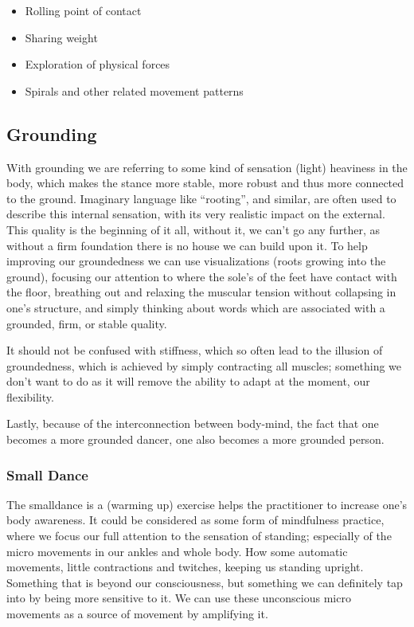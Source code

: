 \begin{itemize}
    \item Rolling point of contact
    \item Sharing weight
    \item Exploration of physical forces
    \item Spirals and other related movement patterns
\end{itemize}

\subsection{Grounding}\label{subsec:grounding}

With grounding we are referring to some kind of sensation (light) heaviness in the body, which makes the stance more stable, more robust and thus more connected to the ground.
Imaginary language like ``rooting'', and similar, are often used to describe this internal sensation, with its very realistic impact on the external.
This quality is the beginning of it all, without it, we can't go any further, as without a firm foundation there is no house we can build upon it.
To help improving our groundedness we can use visualizations (roots growing into the ground), focusing our attention to where the sole's of the feet have contact with the floor, breathing out and relaxing the muscular tension without collapsing in one's structure, and simply thinking about words which are associated with a grounded, firm, or stable quality.

It should not be confused with stiffness, which so often lead to the illusion of groundedness, which is achieved by simply contracting all muscles; something we don't want to do as it will remove the ability to adapt at the moment, our flexibility.

Lastly, because of the interconnection between body-mind, the fact that one becomes a more grounded dancer, one also becomes a more grounded person.

\subsubsection{Small Dance}

The \gls{smalldance} is a (warming up) exercise helps the practitioner to increase one's body awareness.
It could be considered as some form of mindfulness practice, where we focus our full attention to the sensation of standing; especially of the micro movements in our ankles and whole body.
How some automatic movements, little contractions and twitches, keeping us standing upright.
Something that is beyond our consciousness, but something we can definitely tap into by being more sensitive to it.
We can use these unconscious micro movements as a source of movement by amplifying it.

